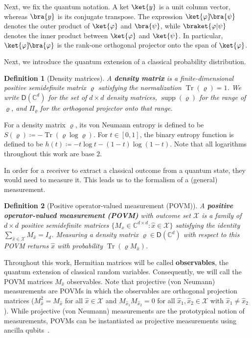 \documentclass[11pt]{article}
\newtheorem{definition}{Definition}[section]
\theoremstyle{remark}
\newcommand{\ketbra}[2]{\ket{#1}\!\bra{#2}}
\newcommand{\cX}{\mathcal{X}}
\newcommand{\C}{\mathbb{C}}
\newcommand{\Tr}{\operatorname{Tr}}
\newcommand{\supp}{\operatorname{supp}}
\newcommand{\Dens}{\mathsf{D}}
\begin{document}
Next, we fix the quantum notation. A ket $\ket{y}$ is a unit column vector, whereas $\bra{y}$ is its conjugate transpose. The expression $\ketbra{\varphi}{\psi}$ denotes the outer product of $\ket{\varphi}$ and $\bra{\psi}$, while $\braket{\varphi|\psi}$ denotes the inner product between $\ket{\varphi}$ and $\ket{\psi}$. In particular, $\ketbra{\varphi}{\varphi}$ is the rank-one orthogonal projector onto the span of $\ket{\varphi}$.

Next, we introduce the quantum extension of a classical probability distribution.

\begin{definition}[Density matrices]
\label{def:density-matrices}
A \textbf{density matrix} is a finite-dimensional positive semidefinite matrix $\varrho$ satisfying the normalization $\Tr(\varrho) = 1$. We write $\Dens(\C^d)$ for the set of $d \times d$ density matrices, $\supp(\varrho)$ for the range of $\varrho$, and $\Pi_\varrho$ for the orthogonal projector onto that range.
\end{definition}

For a density matrix $\varrho$, its von Neumann entropy is defined to be $S(\varrho) \coloneqq -\Tr(\varrho\log{\varrho})$. For $t \in [0,1]$, the binary entropy function is defined to be $h(t) \coloneqq -t\log{t}-(1-t)\log(1-t)$. Note that all logarithms throughout this work are base $2$.

In order for a receiver to extract a classical outcome from a quantum state, they would need to measure it. This leads us to the formalism of a (general) measurement.

\begin{definition}[Positive operator-valued measurement (POVM)]
\label{def:povm}
A \textbf{positive operator-valued measurement (POVM)} with outcome set $\cX$ is a family of $d \times d$ positive semidefinite matrices $\{M_{\hat{x}} \in \C^{d \times d} : \hat{x} \in \cX\}$ satisfying the identity $\sum_{\hat{x} \in \cX}{M_{\hat{x}}} = I_d$. Measuring a density matrix $\varrho \in \Dens(\C^d)$ with respect to this POVM returns $\hat{x}$ with probability $\Tr(\varrho M_{\hat{x}})$.
\end{definition}

Throughout this work, Hermitian matrices will be called \textbf{observables}, the quantum extension of classical random variables. Consequently, we will call the POVM matrices $M_{\hat{x}}$ observables. Note that projective (von Neumann) measurements are POVMs in which the observables are orthogonal projection matrices ($M_{\hat{x}}^2 = M_{\hat{x}}$ for all $\hat{x} \in \cX$ and $M_{\hat{x}_1}M_{\hat{x}_2} = 0$ for all $\hat{x}_1, \hat{x}_2 \in \cX$ with $\hat{x}_1 \neq \hat{x}_2$). While projective (von Neumann) measurements are the prototypical notion of measurements, POVMs can be instantiated as projective measurements using ancilla qubits~\cite[Section 2.2.8]{NC10}.
\end{document}
